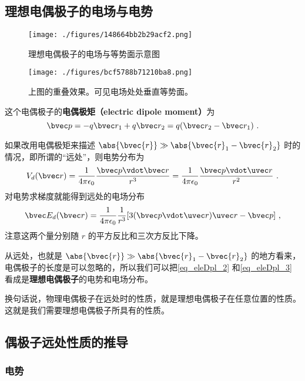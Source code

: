 \subsection{理想电偶极子的电场与电势}
\begin{figure}[ht]
\centering
\texttt{[image: ./figures/148664bb2b29acf2.png]}
\caption{理想电偶极子的电场与等势面示意图} \label{fig_eleDpl_3}
\end{figure}

\begin{figure}[ht]
\centering
\texttt{[image: ./figures/bcf5788b71210ba8.png]}
\caption{上图的重叠效果。可见电场处处垂直等势面。} \label{fig_eleDpl_4}
\end{figure}

这个电偶极子的\textbf{电偶极矩（electric dipole moment）}为
\begin{equation}\label{eq_eleDpl_1}
\bvec p = -q \bvec r_1 + q \bvec r_2 = q (\bvec r_2 - \bvec r_1)~.
\end{equation} 

如果改用电偶极矩来描述 $\abs{\bvec{r}}\gg\\\abs{\bvec{r}_1-\bvec{r}_2}$ 时的情况，即所谓的“远处”，则电势分布为
\begin{equation}\label{eq_eleDpl_2}
V_d(\bvec r) = \frac{1}{4\pi\epsilon_0} \frac{\bvec p\vdot \bvec r}{r^3} = \frac{1}{4\pi\epsilon_0} \frac{\bvec p \vdot \uvec r}{r^2}~.
\end{equation}
对电势求梯度就能得到远处的电场分布
\begin{equation}\label{eq_eleDpl_3}
\bvec E_d(\bvec r) = \frac{1}{4\pi\epsilon_0} \frac{1}{r^3} [3(\bvec p \vdot \uvec r) \uvec r - \bvec p]~,
\end{equation}
注意这两个量分别随 $r$ 的平方反比和三次方反比下降。

从远处，也就是 $\abs{\bvec{r}}\gg\\\abs{\bvec{r}_1-\bvec{r}_2}$ 的地方看来，电偶极子的长度是可以忽略的，所以我们可以把\autoref{eq_eleDpl_2} 和\autoref{eq_eleDpl_3} 看成是\textbf{理想电偶极子}的电势和电场分布。

换句话说，物理电偶极子在远处时的性质，就是理想电偶极子在任意位置的性质。这就是我们需要理想电偶极子所具有的性质。

\subsection{偶极子远处性质的推导}

\subsubsection{电势}

